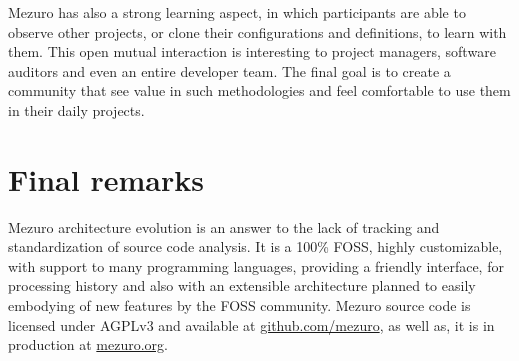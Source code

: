\documentclass{llncs}
\begin{document}
Mezuro has also a strong learning aspect, in which participants are able to
observe other projects, or clone their configurations and definitions, to
learn with them.  This open mutual interaction is interesting to project
managers, software auditors and even an entire developer team. The final goal
is to create a community that see value in such methodologies and feel
comfortable to use them in their daily projects.

\section{Final remarks}

Mezuro architecture evolution is an answer to the lack of tracking and
standardization of source code analysis. It is a 100\% FOSS, highly
customizable, with support to many programming languages, providing a friendly
interface, for processing history and also with an extensible architecture
planned to easily embodying of new features by the FOSS community. Mezuro
source code is licensed under AGPLv3 and available at \url{github.com/mezuro},
as well as, it is in production at \url{mezuro.org}.



\end{document}
